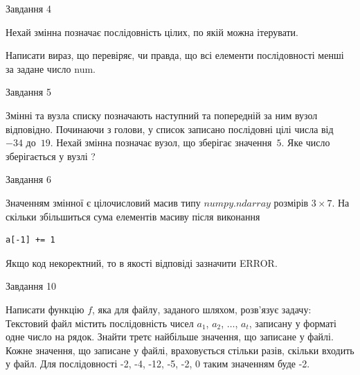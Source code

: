 \documentclass[12pt, ukrainian]{article}
\begin{document}
{\begin{minipage}[t]{8.0cm}
\end{minipage}


               
{\begin{center}Завдання {4}\end{center}}
\vspace{-4mm}
Нехай змінна  позначає послідовність цілих, по якій можна ітерувати.

Написати вираз, що перевіряє, чи правда, що всі елементи послідовності менші за задане число num.\par

\vspace{10mm}
               
{\begin{center}Завдання {5}\end{center}}
\vspace{-4mm}
Змінні  та  вузла списку позначають наступний та попередній за ним вузол відповідно. Починаючи з голови, у список записано послідовні цілі числа від~$-34$ до~$19$. Нехай змінна  позначає вузол, що зберігає значення~$5$.
Яке число зберігається у вузлі  ?\par

               
{\begin{center}Завдання {6}\end{center}}
\vspace{-4mm}
Значенням змінної  є цілочисловий масив типу $numpy.ndarray$ розмірів $3{\times}7$. На скільки збільшиться сума елементів масиву  після виконання
\begin{verbatim}
a[-1] += 1
\end{verbatim}


Якщо код некоректний, то в якості відповіді зазначити ERROR.\par

               
{\begin{center}Завдання {10}\end{center}}
\vspace{-4mm}

Написати функцію $f$, яка для файлу, заданого шляхом, розв’язує задачу:\\ Текстовий файл містить послідовність чисел $a_1$, $a_2$, $\ldots$, $a_t$, записану у форматі одне число на рядок. Знайти третє найбільше значення, що записане у файлі. Кожне значення, що записане у файлі, враховується стільки разів, скільки входить у файл. Для послідовності -2, -4, -12, -5, -2, 0 таким значенням буде -2.

}
\end{document}
